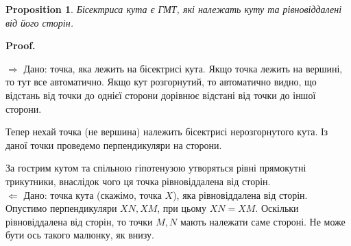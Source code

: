 \documentclass[a4paper, 10pt]{article}
\makeatletter
\def\rightproof{$\boxed{\Rightarrow}$ }
\def\leftproof{$\boxed{\Leftarrow}$ }
\theoremstyle{theoremdd}
\theoremstyle{theoremdd}
\theoremstyle{theoremdd}
\theoremstyle{theoremdd}
\theoremstyle{theoremdd}
\theoremstyle{theoremdd}
\newtheorem{proposition}[theorem]{Proposition}
\theoremstyle{theoremdd}
\theoremstyle{theoremdd}
\theoremstyle{theoremdd}
\renewenvironment{proof}[1][Proof.\\]{\par
\pushQED{\hfill \qed}%
\normalfont \topsep6\p@\@plus6\p@\relax
\trivlist
\item\relax
{\bfseries
#1\@addpunct{.}}\hspace\labelsep\ignorespaces
}{%
\popQED\endtrivlist\@endpefalse
}
\makeatother
\begin{document}
\begin{proposition}
Бісектриса кута є ГМТ, які належать куту та рівновіддалені від його сторін.
\end{proposition}

\begin{proof}
\rightproof Дано: точка, яка лежить на бісектрисі кута. Якщо точка лежить на вершині, то тут все автоматично. Якщо кут розгорнутий, то автоматично видно, що відстань від точки до однієї сторони дорівнює відстані від точки до іншої сторони.
\begin{figure}[H]
\centering
{}
\end{figure}
Тепер нехай точка (не вершина) належить бісектрисі нерозгорнутого кута. Із даної точки проведемо перпендикуляри на сторони.
\begin{figure}[H]
\centering
{}
\end{figure}
За гострим кутом та спільною гіпотенузою утворяться рівні прямокутні трикутники, внаслідок чого ця точка рівновіддалена від сторін.
\bigskip \\
\leftproof Дано: точка кута (скажімо, точка $X$), яка рівновіддалена від сторін. Опустимо перпендикуляри $XN,XM$, при цьому $XN = XM$. Оскільки рівновіддалена від сторін, то точки $M,N$ мають належати саме стороні. Не може бути ось такого малюнку, як внизу.
\begin{figure}[H]
\centering
{}
\end{figure}
\end{proof}
\end{document}
